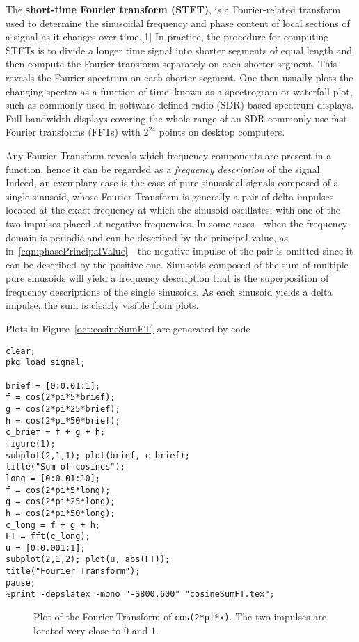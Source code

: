 \documentclass[\documentfontsize, twocolumn]{\classname}
\begin{document}
The \textbf{short-time Fourier transform (STFT)}, is a Fourier-related
transform used to determine the sinusoidal frequency and phase content of local
sections of a signal as it changes over time.[1] In practice, the procedure for
computing STFTs is to divide a longer time signal into shorter segments of
equal length and then compute the Fourier transform separately on each shorter
segment. This reveals the Fourier spectrum on each shorter segment. One then
usually plots the changing spectra as a function of time, known as a
spectrogram or waterfall plot, such as commonly used in software defined radio
(SDR) based spectrum displays. Full bandwidth displays covering the whole range
of an SDR commonly use fast Fourier transforms (FFTs) with $2^{24}$ points on
desktop computers\cite{bib:shortTimeFourierTransform}.

Any Fourier Transform reveals which frequency components are present in a
function, hence it can be regarded as a \emph{frequency description} of the
signal. Indeed, an exemplary case is the case of pure sinusoidal signals
composed of a single sinusoid, whose Fourier Transform is generally a pair of
delta-impulses located at the exact frequency at which the sinusoid oscillates,
with one of the two impulses placed at negative frequencies. In some
cases---when the frequency domain is periodic and can be described by the
principal value, as in~\ref{eqn:phasePrincipalValue}---the negative impulse of
the pair is omitted since it can be described by the positive one. Sinusoids
composed of the sum of multiple pure sinusoids will yield a frequency
description that is the superposition of frequency descriptions of the single
sinusoids. As each sinusoid yields a delta impulse, the sum is clearly visible
from plots.

Plots in Figure~\ref{oct:cosineSumFT} are generated by code 

\begin{verbatim}
clear;
pkg load signal;

brief = [0:0.01:1];
f = cos(2*pi*5*brief);
g = cos(2*pi*25*brief);
h = cos(2*pi*50*brief);
c_brief = f + g + h;
figure(1);
subplot(2,1,1); plot(brief, c_brief);
title("Sum of cosines");
long = [0:0.01:10];
f = cos(2*pi*5*long);
g = cos(2*pi*25*long);
h = cos(2*pi*50*long);
c_long = f + g + h;
FT = fft(c_long);
u = [0:0.001:1];
subplot(2,1,2); plot(u, abs(FT)); 
title("Fourier Transform");
pause;
%print -depslatex -mono "-S800,600" "cosineSumFT.tex";
\end{verbatim}

\begin{figure*}[ht]
\begin{center}
\scalebox{0.5}{

    }\caption{Plot of the Fourier Transform of \texttt{cos(2*pi*x)}. The two
    impulses are located very close to $0$ and $1$.}\label{oct:cosineFT}
\end{center}
\end{figure*}
\end{document}
